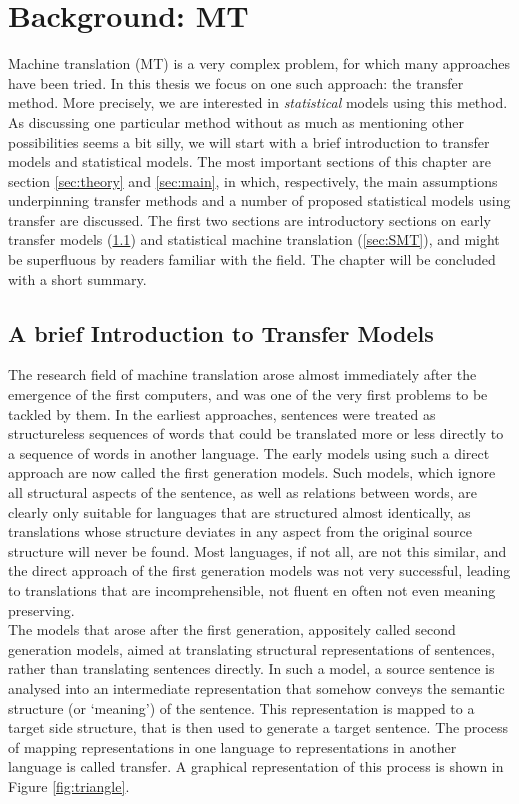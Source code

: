 \documentclass[a4paper, 11pt]{report}
\theoremstyle{definition}
\theoremstyle{plain}
\begin{document}
\chapter{Background: MT}
\label{ch:background}

Machine translation (MT) is a very complex problem, for which many approaches have been tried. In this thesis we focus on one such approach: the transfer method. More precisely, we are interested in \textit{statistical} models using this method. As discussing one particular method without as much as mentioning other possibilities seems a bit silly, we will start with a brief introduction to transfer models and statistical models. The most important sections of this chapter are section \ref{sec:theory} and \ref{sec:main}, in which, respectively, the main assumptions underpinning transfer methods and a number of proposed statistical models using transfer are discussed. The first two sections are introductory sections on early transfer models (\ref{sec:intro}) and statistical machine translation (\ref{sec:SMT}), and might be superfluous by readers familiar with the field. The chapter will be concluded with a short summary.


\section{A brief Introduction to Transfer Models}
\label{sec:intro}

The research field of machine translation arose almost immediately after the emergence of the first computers, and was one of the very first problems to be tackled by them. In the earliest approaches, sentences were treated as structureless sequences of words that could be translated more or less directly to a sequence of words in another language. The early models using such a direct approach are now called the first generation models. Such models, which ignore all structural aspects of the sentence, as well as relations between words, are clearly only suitable for languages that are structured almost identically, as translations whose structure deviates in any aspect from the original source structure will never be found. Most languages, if not all, are not this similar, and the direct approach of the first generation models was not very successful, leading to translations that are incomprehensible, not fluent en often not even meaning preserving.\\
The models that arose after the first generation, appositely called second generation models, aimed at translating structural representations of sentences, rather than translating sentences directly. In such a model, a source sentence is analysed into an intermediate representation that somehow conveys the semantic structure (or `meaning') of the sentence. This representation is mapped to a target side structure, that is then used to generate a target sentence. The process of mapping representations in one language to representations in another language is called transfer. A graphical representation of this process is shown in Figure \ref{fig:triangle}. 
\end{document}

